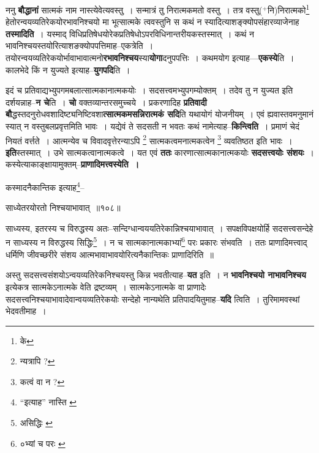 \documentclass[article,12pt,a4paper]{memoir}
\newcommand{\add}[1]{($^{+}$#1)}
\begin{document}
	  \pstart ननु \textbf{बौद्धानां} सात्मकं नाम नास्त्येवेत्यवस्तु । सन्मात्रं तु निरात्मकमतो वस्तु । तत्र वस्तु\add{नि}निरात्मको\footnote{के} हेतोरन्वयव्यतिरेकयोरभावनिश्चयो मा भूत्सात्मके त्ववस्तुनि स कथं न स्यादित्याशङ्क्योपसंहारव्याजेनाह \textbf{तस्मादिति} । यस्माद् विधिप्रतिषेधयोरेकप्रतिषेधोऽपरविधिनान्तरीयकस्तस्मात् । कथं न भावनिश्चयस्तयोरित्याशङक्योपपत्तिमाह--एकत्रेति । तयोरन्वयव्यतिरेकयोर्भावाभावात्मनो\textbf{रभावनिश्चय}स्या\textbf{योगा}दनुपपत्तिः । कथमयोग इत्याह—\textbf{एकस्ये}ति । कालभेदे किं न युज्यते इत्याह--\textbf{युगपदि}ति ।
	\pend
      

	  \pstart इदं च प्रतिवाद्यभ्युपगमबलात्सात्मकानात्मकयोः । सदसत्त्वमभ्युपगम्योक्तम् । तदेव तु न युज्यत इति दर्शयन्नाह--\textbf{न चे}ति । \textbf{चो} वक्तव्यान्तरसमुच्चये । प्रकरणादिह \textbf{प्रतिवादी बौ}द्धस्तदनुरोधवशादिष्ट्यनिष्टिवशा\textbf{त्सात्मकमसन्निरात्मकं सदि}ति यथायोगं योजनीयम् । एवं ह्यवास्तवमनुमानं स्यात् न वस्तुबलप्रवृत्तमिति भावः । यद्येवं ते सदसती न भवतः कथं नामेत्याह--\textbf{किन्त्विति} । प्रमाणं चेदं नियतं वर्त्तते । आत्मन्येव च विवादवृत्तेरन्याऽपि \footnote{न्यत्रापि ?} सात्मकत्वमनात्मकत्वेन \footnote{कत्वं वा न ?} व्यवतिष्ठत इति भावः । \textbf{इति}स्तस्मात् । उभे सात्मकत्वानात्मकत्वे । यत एवं \textbf{ततः} कारणात्सात्मकानात्मकयोः \textbf{सदसत्त्वयोः संशयः} । कस्येत्याकाङ्क्षायामुक्तम्--\textbf{प्राणादिमत्त्वस्येति ।}
	\pend
      \leavevmode{}
	  \bigskip
	  \begingroup
	

	  \pstart कस्मादनैकान्तिक इत्याह\footnote{“इत्याह” नास्ति \cite{dp-msA} \cite{dp-msB} \cite{dp-msC} \cite{dp-msD} \cite{dp-edP} \cite{dp-edH} \cite{dp-edN}}--
	\pend
       
	  \bigskip
	  \begingroup
	

	  \pstart साध्येतरयोरतो निश्चयाभावात् ॥१०८॥
	\pend
      
	  \endgroup
	 

	  \pstart साध्यस्य, इतरस्य च विरुद्धस्य अतः--सन्दिग्धान्वययतिरेकान्निश्चयाभावात् । सपक्षविपक्षयोर्हि सदसत्त्वसन्देहे न साध्यस्य न विरुद्धस्य सिद्धिः\footnote{असिद्धिः \cite{dp-msB}} । न च सात्मकानात्मकाभ्यां\footnote{०भ्यां च परः \cite{dp-msA} \cite{dp-msB} \cite{dp-edP} \cite{dp-edH} \cite{dp-edN}} परः प्रकारः संभवति । ततः प्राणादिमत्त्वाद् धर्मिणि जीवच्छरीरे संशय आत्मभावाभावयोरित्यनैकान्तिकः प्राणादिरिति ॥
	\pend
      
	  \endgroup
	

	  \pstart अस्तु सदसत्त्वसंशयोऽन्वयव्यतिरेकनिश्चयस्तु किन्न भवतीत्याह--\textbf{यत} इति । न \textbf{भावनिश्चयो नाभावनिश्चय} इत्येकत्र सात्मकेऽनात्मके वेति द्रष्टव्यम् । सात्मकेऽनात्मके वा प्राणादेः सदसत्त्वनिश्चयाभावादेवान्वयव्यतिरेकयोः सन्देहो नान्यथेति प्रतिपादयितुमाह--\textbf{यदि} त्विति । तुरिमामवस्थां भेदवतीमाह ।
	\pend
      
\end{document}
